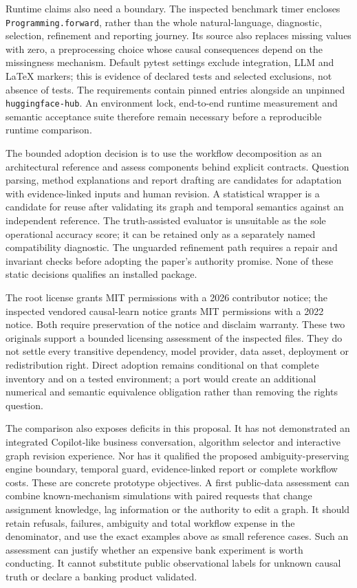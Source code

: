 Runtime claims also need a boundary. The inspected benchmark timer encloses
\texttt{Programming.forward}, rather than the whole natural-language,
diagnostic, selection, refinement and reporting journey. Its source also
replaces missing values with zero, a preprocessing choice whose causal
consequences depend on the missingness mechanism. Default pytest settings
exclude integration, LLM and LaTeX markers; this is evidence of declared tests
and selected exclusions, not absence of tests. The requirements contain pinned
entries alongside an unpinned \texttt{huggingface-hub}. An environment lock,
end-to-end runtime measurement and semantic acceptance suite therefore remain
necessary before a reproducible runtime comparison.
\citep{exec17_copilot_code}

The bounded adoption decision is to use the workflow decomposition as an
architectural reference and assess components behind explicit contracts.
Question parsing, method explanations and report drafting are candidates for
adaptation with evidence-linked inputs and human revision. A statistical
wrapper is a candidate for reuse after validating its graph and temporal
semantics against an independent reference. The truth-assisted evaluator is
unsuitable as the sole operational accuracy score; it can be retained only as
a separately named compatibility diagnostic. The unguarded refinement path
requires a repair and invariant checks before adopting the paper's authority
promise. None of these static decisions qualifies an installed package.
\citep{exec17_copilot_code,exec17_copilot_exact}

The root license grants MIT permissions with a 2026 contributor notice; the
inspected vendored causal-learn notice grants MIT permissions with a 2022
notice. Both require preservation of the notice and disclaim warranty. These
two originals support a bounded licensing assessment of the inspected files.
They do not settle every transitive dependency, model provider, data asset,
deployment or redistribution right. Direct adoption remains conditional on
that complete inventory and on a tested environment; a port would create an
additional numerical and semantic equivalence obligation rather than removing
the rights question.~\citep{exec17_copilot_rights}

The comparison also exposes deficits in this proposal. It has not demonstrated
an integrated Copilot-like business conversation, algorithm selector and
interactive graph revision experience. Nor has it qualified the proposed
ambiguity-preserving engine boundary, temporal guard, evidence-linked report
or complete workflow costs. These are concrete prototype objectives. A first
public-data assessment can combine known-mechanism simulations with paired
requests that change assignment knowledge, lag information or the authority
to edit a graph. It should retain refusals, failures, ambiguity and total
workflow expense in the denominator, and use the exact examples above as
small reference cases. Such an assessment can justify whether an expensive
bank experiment is worth conducting. It cannot substitute public observational
labels for unknown causal truth or declare a banking product validated.
\label{exec17:copilot-development-end}


